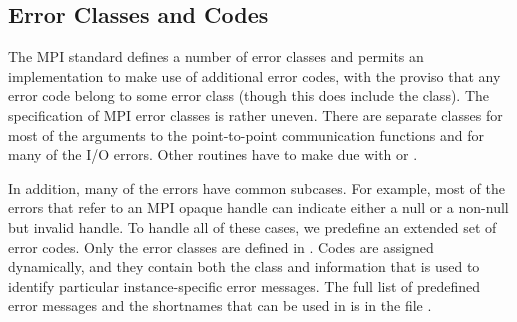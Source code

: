 %
\subsection{Error Classes and Codes}
The MPI standard defines a number of error classes and permits an
implementation to make use of additional error codes, with the proviso that
any error code belong to some error class (though this does include the
 class).  
The specification of MPI error classes is rather uneven.  There are separate
classes for most of the arguments to the point-to-point communication
functions and for many of the I/O errors.  Other routines have to make due
with  or .

In addition, many of the errors have common subcases.  For example, most of
the errors that refer to an MPI opaque handle can indicate either a null or a
non-null but invalid handle.   To handle all of these cases, we predefine an
extended set of error codes.  Only the error classes are defined in
.
Codes are assigned dynamically, and they contain both the class and
information that is used to identify particular instance-specific
error messages.  The full list of predefined error messages and the
shortnames that can be used in  is in
the file .




